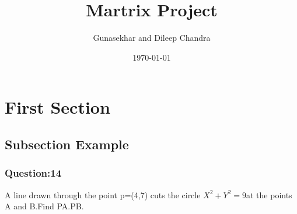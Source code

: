 \documentclass{beamer}
\title{\huge Martrix Project}
\author{Gunasekhar and Dileep Chandra}
\institute{IITH}
\date{\today}
\begin{document}
\begin{frame}[plain]
    \titlepage
\end{frame}

\section{First Section}
\subsection{Subsection Example}



\begin{frame}
\frametitle{Question:14}
A line drawn through the point p=(4,7)
cuts the circle $X^2+Y^2=9$at the points A and B.Find PA.PB.
\end{frame}

\end{document}
